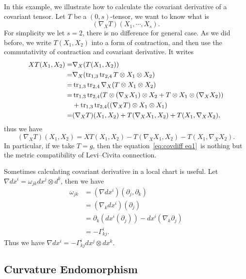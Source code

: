 \begin{eg}
    In this example, we illustrate how to calculate the covariant derivative of a covariant tensor.
    Let $T$ be a $(0,s)$-tensor, we want to know what is
    \[(\nabla_XT)(X_1,\cdots,X_s).\]
    For simplicity we let $s=2$, there is no difference for general case.
    As we did before, we write $T(X_1,X_2)$ into a form of contraction, and then use the commutativity of contraction and covariant derivative.
    It writes
    \begin{align*}
        XT(X_1,X_2)=&\nabla_X(T(X_1,X_2))\\
        =&\nabla_X(\operatorname{tr}_{1,3}\operatorname{tr}_{2,4}T\otimes X_1\otimes X_2)\\
        =&\operatorname{tr}_{1,3}\operatorname{tr}_{2,4}\nabla_X(T\otimes X_1\otimes X_2)\\
        =&\operatorname{tr}_{1,3}\operatorname{tr}_{2,4}(T\otimes(\nabla_XX_1)\otimes X_2+T\otimes X_1\otimes(\nabla_XX_2))\\
        &+\operatorname{tr}_{1,3}\operatorname{tr}_{2,4}((\nabla_XT)\otimes X_1\otimes X_1)\\
        =&(\nabla_XT)(X_1,X_2)+T(\nabla_XX_1,X_2)+T(X_1,\nabla_XX_2),
    \end{align*}
    thus we have
    \begin{equation}
        (\nabla_XT)(X_1,X_2)=XT(X_1,X_2)-T(\nabla_XX_1,X_2)-T(X_1,\nabla_XX_2).\label{eq:covdiff eq1}
    \end{equation}
    In particular, if we take $T=g$, then the equation~\eqref{eq:covdiff eq1}~is nothing but the metric compatibility of Levi--Civita connection.
\end{eg}

\begin{eg}
    Sometimes calculating covariant derivative in a local chart is useful.
    Let $\nabla dx^i=\omega_{jk}dx^j\otimes d^k$, then we have
    \begin{align*}
        \omega_{jk}&=(\nabla dx^i)(\partial_j,\partial_k)\\
        &=(\nabla_kdx^i)(\partial_j)\\
        &=\partial_k(dx^i(\partial_j))-dx^i(\nabla_k\partial_j)\\
        &=-\Gamma_{kj}^i.
    \end{align*}
    Thus we have $\nabla dx^i=-\Gamma_{kj}^idx^j\otimes dx^k$.
\end{eg}

\subsection{Curvature Endomorphism}

